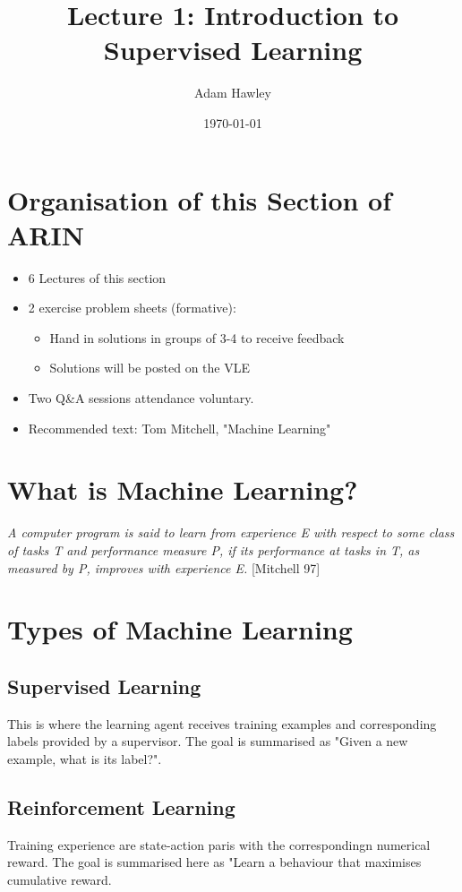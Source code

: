 \documentclass[11pt]{article}
\author{Adam Hawley}
\date{\today}
\title{Lecture 1: Introduction to Supervised Learning}
\begin{document}
\maketitle
\tableofcontents


\section{Organisation of this Section of ARIN}
\label{sec:org4ef6da0}
\begin{itemize}
\item 6 Lectures of this section
\item 2 exercise problem sheets (formative):
\begin{itemize}
\item Hand in solutions in groups of 3-4 to receive feedback
\item Solutions will be posted on the VLE
\end{itemize}
\item Two Q\&A sessions attendance voluntary.
\item Recommended text: Tom Mitchell, "Machine Learning"
\end{itemize}

\section{What is Machine Learning?}
\label{sec:orga9bb5aa}
   \emph{A computer program is said to learn from experience E with respect to some class of tasks T and performance measure P, if its performance at tasks in T, as measured by P, improves with experience E.}
[Mitchell 97]

\section{Types of Machine Learning}
\label{sec:orgfdd196b}
\subsection{Supervised Learning}
\label{sec:org94f2cc5}
This is where the learning agent receives training examples and corresponding labels provided by a supervisor.
The goal is summarised as "Given a new example, what is its label?".

\subsection{Reinforcement Learning}
\label{sec:org66fde40}
Training experience are state-action paris with the correspondingn numerical reward.
The goal is summarised here as "Learn a behaviour that maximises cumulative reward.
\end{document}
